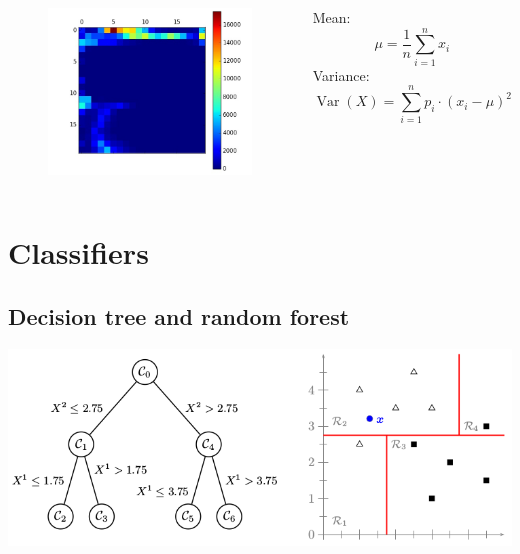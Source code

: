 \documentclass[aspectratio=169]{beamer}
\let\oldsection\section
\renewcommand{\section}[1]{
    \oldsection{#1}	
    \subsection{}
}
\newenvironment{myframe}[1][t]{\begin{frame}[#1]{\secname}{\subsecname}}{\end{frame}}
\begin{document}
    \begin{myframe}
        \vspace{-0.5cm}
        \begin{columns}
            \centering
            \begin{figure}[h]
                \includegraphics[scale=0.35]{../img/joint_histogram}
            \end{figure}
            
            \centering
            Mean:
            $$ \mu = \frac{1}{n} \sum_{i = 1}^{n} x_i $$
            Variance:
            $$ \operatorname {Var} (X)=\sum _{i=1}^{n}p_{i}\cdot (x_{i}-\mu )^{2} $$
        \end{columns}
    \end{myframe}
    
    \section{Classifiers}
    
    \subsection{Decision tree and random forest}
    
    \begin{myframe}
        \begin{center}
            \includegraphics[scale=0.50]{../img/decision_tree_simple_example}
        \end{center}
    \end{myframe}
    
\end{document}
